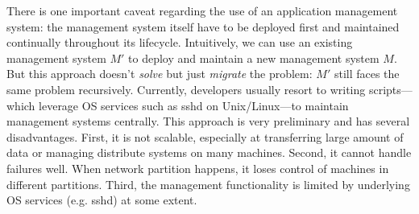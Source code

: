 There is one important caveat regarding the use of an
application management system: the management system itself
have to be deployed first and maintained continually
throughout its lifecycle. Intuitively, we can use an
existing management system $M'$ to deploy and maintain a new
management system $M$. But this approach doesn't
\emph{solve} but just \emph{migrate} the problem: $M'$ still
faces the same problem recursively.  Currently, developers
usually resort to writing scripts---which leverage OS
services such as sshd on Unix/Linux---to maintain management
systems centrally. This approach is very preliminary and has
several disadvantages.  First, it is not scalable,
especially at transferring large amount of data or managing
distribute systems on many machines. Second, it cannot
handle failures well. When network partition happens, it
loses control of machines in different partitions. Third, the
management functionality is limited by underlying OS
services (e.g. sshd) at some extent.

%
%
%
%
%
%
%
%
%
%
%

